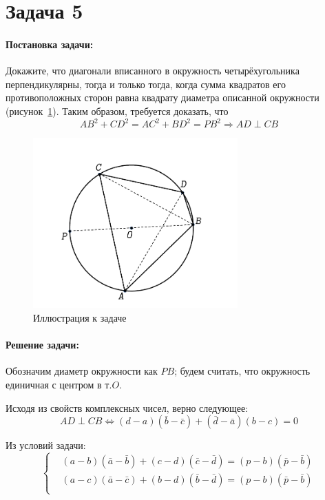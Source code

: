 {
   \section*{Задача 5}
   \paragraph{Постановка задачи:}
   Докажите, что диагонали вписанного в окружность четырёхугольника перпендикулярны, тогда и только тогда,
   когда сумма квадратов его противоположных сторон равна квадрату диаметра описанной окружности (рисунок~\ref{t5:im}).
   Таким образом, требуется доказать, что
   \begin{equation}
      AB^2+CD^2 = AC^2+BD^2 = PB^2 \Rightarrow AD \perp CB
      \label{t5:f1}
   \end{equation}
   \begin{figure}[h]
      \centering
      \includegraphics[width=0.7\textwidth]{images/task5.pdf}
      \caption{Иллюстрация к задаче}
      \label{t5:im}
   \end{figure}
   \paragraph{Решение задачи:}
   Обозначим диаметр окружности как \(PB\); будем считать, что окружность единичная с центром в т.\(O\).

   Исходя из свойств комплексных чисел, верно следующее:
   \begin{equation*}
      AD \perp CB \Leftrightarrow (d-a)(\bar{b}-\bar{c})+(\bar{d}-\bar{a})(b-c) = 0
      \label{t5:f2}
   \end{equation*}

   Из условий задачи:
   \begin{equation}
      \left\{ \begin{aligned}
          & (a - b)(\bar{a} - \bar{b}) + (c - d)(\bar{c} - \bar{d}) = (p - b)(\bar{p} - \bar{b}) \\
          & (a - c)(\bar{a} - \bar{c}) + (b - d)(\bar{b} - \bar{d}) = (p - b)(\bar{p} - \bar{b}) \\
      \end{aligned}
      \right. \label{t5:f3}
   \end{equation}

}
